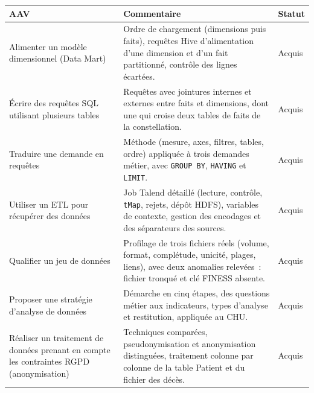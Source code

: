 \begin{center}
\small
\setlength{\tabcolsep}{8pt}
\renewcommand{\arraystretch}{1.15}

\begin{tabular}{|>{\raggedright\arraybackslash}p{}|>{\raggedright\arraybackslash}p{}|m{}|}
\hline
\textbf{AAV} & \textbf{Commentaire} & \textbf{Statut} \\ \hline

Alimenter un modèle dimensionnel (Data Mart) &
Ordre de chargement (dimensions puis faits), requêtes Hive d'alimentation d'une dimension et d'un fait partitionné, contrôle des lignes écartées. &
{\color{green!60!black}Acquis} \\ \hline

Écrire des requêtes SQL utilisant plusieurs tables &
Requêtes avec jointures internes et externes entre faits et dimensions, dont une qui croise deux tables de faits de la constellation. &
{\color{green!60!black}Acquis} \\ \hline

Traduire une demande en requêtes &
Méthode (mesure, axes, filtres, tables, ordre) appliquée à trois demandes métier, avec \texttt{GROUP BY}, \texttt{HAVING} et \texttt{LIMIT}. &
{\color{green!60!black}Acquis} \\ \hline

Utiliser un ETL pour récupérer des données &
Job Talend détaillé (lecture, contrôle, \texttt{tMap}, rejets, dépôt HDFS), variables de contexte, gestion des encodages et des séparateurs des sources. &
{\color{green!60!black}Acquis} \\ \hline

Qualifier un jeu de données &
Profilage de trois fichiers réels (volume, format, complétude, unicité, plages, liens), avec deux anomalies relevées~: fichier tronqué et clé FINESS absente. &
{\color{green!60!black}Acquis} \\ \hline

Proposer une stratégie d'analyse de données &
Démarche en cinq étapes, des questions métier aux indicateurs, types d'analyse et restitution, appliquée au CHU. &
{\color{green!60!black}Acquis} \\ \hline

Réaliser un traitement de données prenant en compte les contraintes RGPD (anonymisation) &
Techniques comparées, pseudonymisation et anonymisation distinguées, traitement colonne par colonne de la table Patient et du fichier des décès. &
{\color{green!60!black}Acquis} \\ \hline


\end{tabular}
\end{center}

